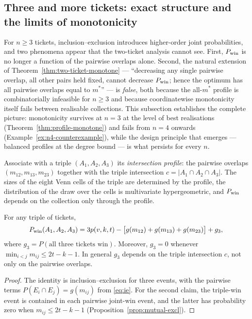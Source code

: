 \subsection{Three and more tickets: exact structure and the limits of
            monotonicity}
\label{sec:general-n}

For $n \ge 3$ tickets, inclusion--exclusion introduces higher-order joint
probabilities, and two phenomena appear that the two-ticket analysis cannot
see.  First, $P_{\mathrm{win}}$ is no longer a function of the pairwise overlaps
alone.  Second, the natural extension of
Theorem~\ref{thm:two-ticket-monotone} --- ``decreasing any single pairwise
overlap, all other pairs held fixed, cannot decrease $P_{\mathrm{win}}$; hence the
optimum has all pairwise overlaps equal to $m^*$'' --- is \emph{false},
both because the all-$m^*$ profile is combinatorially infeasible for
$n \ge 3$ and because coordinatewise monotonicity itself fails between
realisable collections.  This subsection establishes the complete
picture: monotonicity survives at $n = 3$ at the level of best
realisations (Theorem~\ref{thm:profile-monotone}) and fails from $n = 4$
onwards (Example~\ref{ex:n4-counterexample}), while the design principle
that emerges --- balanced profiles at the degree bound --- is what
persists for every $n$.

Associate with a triple $(A_1,A_2,A_3)$ its \emph{intersection profile}:
the pairwise overlaps $(m_{12}, m_{13}, m_{23})$ together with the triple
intersection $c = |A_1 \cap A_2 \cap A_3|$.  The sizes of the eight Venn
cells of the triple are determined by the profile, the distribution of the
draw over the cells is multivariate hypergeometric, and $P_{\mathrm{win}}$ depends on
the collection only through the profile.

\begin{proposition}
  \label{prop:three-ticket}
  For any triple of tickets,
  \[
    P_{\mathrm{win}}(A_1,A_2,A_3)
    = 3p(v,k,t) - \bigl[g(m_{12}) + g(m_{13}) + g(m_{23})\bigr] + g_3,
  \]
  where $g_3 = P(\text{all three tickets win})$.  Moreover, $g_3 = 0$
  whenever $\min_{i<j} m_{ij} \le 2t-k-1$.  In general $g_3$ depends on
  the triple intersection $c$, not only on the pairwise overlaps.
\end{proposition}

\begin{proof}
  The identity is inclusion--exclusion for three events, with the
  pairwise terms $P(E_i \cap E_j) = g(m_{ij})$ from \eqref{eq:ie}.  For
  the second claim, the triple-win event is contained in each pairwise
  joint-win event, and the latter has probability zero when
  $m_{ij} \le 2t-k-1$ (Proposition~\ref{prop:mutual-excl}).
\end{proof}

